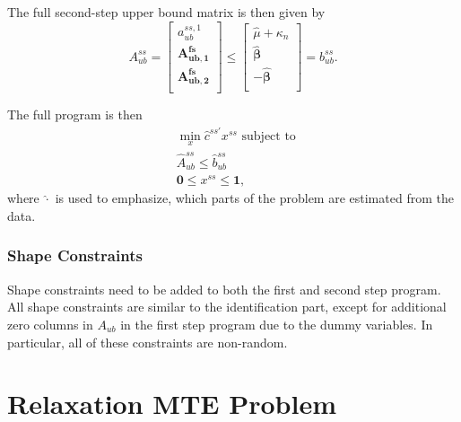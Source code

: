 \documentclass[12pt,a4paper,english]{article} %
\numberwithin{equation}{section}
\theoremstyle{definition}
\theoremstyle{remark}
\theoremstyle{plain}
\begin{document}
The full second-step upper bound matrix is then given by
\begin{equation*}
  A_{ub}^{ss} = \begin{bmatrix}
    a_{ub}^{ss, 1} \\
    \mathbf{A_{ub,1}^{fs}} \\
    \mathbf{A_{ub,2}^{fs}} \\
  \end{bmatrix}
  \leq
  \begin{bmatrix}
    \hat{\mu} + \kappa_n \\
    \mathbf{\hat{\beta}} \\
    - \mathbf{\hat{\beta}} \\
  \end{bmatrix}
  = b_{ub}^{ss}.
\end{equation*}

The full program is then
\begin{align}
  & \min_x \hat{c}^{ss'}x^{ss} \text{ subject to }\\
  & \hat{A}_{ub}^{ss} \leq \hat{b}_{ub}^{ss} \\
  & \mathbf{0} \leq x^{ss} \leq \mathbf{1},
\end{align}
where $\hat{\cdot}$ is used to emphasize, which parts of the problem are estimated from the data.

\subsubsection{Shape Constraints}
Shape constraints need to be added to both the first and second step program.
All shape constraints are similar to the identification part, except for additional zero columns in $A_{ub}$ in the first step program due to the dummy variables.
In particular, all of these constraints are non-random.

\clearpage
\newpage

\section{Relaxation MTE Problem}
\end{document}
